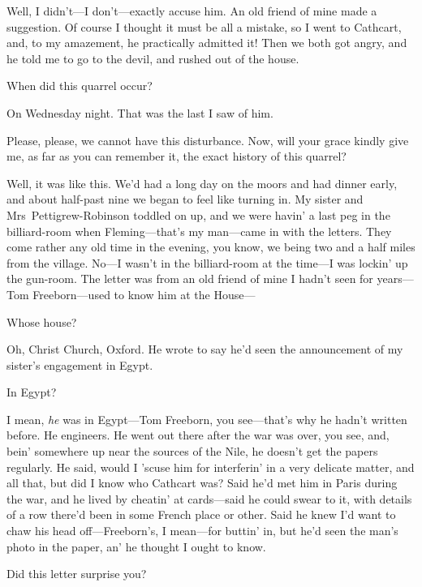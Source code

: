 \begin{dialogue}
 Well, I didn't—I don't—exactly accuse him. An old friend of mine made a suggestion. Of course I thought it must be all a mistake, so I went to Cathcart, and, to my amazement, he practically admitted it! Then we both got angry, and he told me to go to the devil, and rushed out of the house. 

 When did this quarrel occur?

 On Wednesday night. That was the last I saw of him. 

 Please, please, we cannot have this disturbance. Now, will your grace kindly give me, as far as you can remember it, the exact history of this quarrel?

 Well, it was like this. We'd had a long day on the moors and had dinner early, and about half-past nine we began to feel like turning in. My sister and Mrs~Pettigrew-Robinson toddled on up, and we were havin' a last peg in the billiard-room when Fleming—that's my man—came in with the letters. They come rather any old time in the evening, you know, we being two and a half miles from the village.  No—I wasn't in the billiard-room at the time—I was lockin' up the gun-room. The letter was from an old friend of mine I hadn't seen for years—Tom Freeborn—used to know him at the House—

 Whose house?

 Oh, Christ Church, Oxford. He wrote to say he'd seen the announcement of my sister's engagement in Egypt.

 In Egypt?

 I mean, \emph{he} was in Egypt—Tom Freeborn, you see—that's why he hadn't written before. He engineers. He went out there after the war was over, you see, and, bein' somewhere up near the sources of the Nile, he doesn't get the papers regularly. He said, would I 'scuse him for interferin' in a very delicate matter, and all that, but did I know who Cathcart was? Said he'd met him in Paris during the war, and he lived by cheatin' at cards—said he could swear to it, with details of a row there'd been in some French place or other. Said he knew I'd want to chaw his head off—Freeborn's, I mean—for buttin' in, but he'd seen the man's photo in the paper, an' he thought I ought to know.

 Did this letter surprise you?


\end{dialogue}

